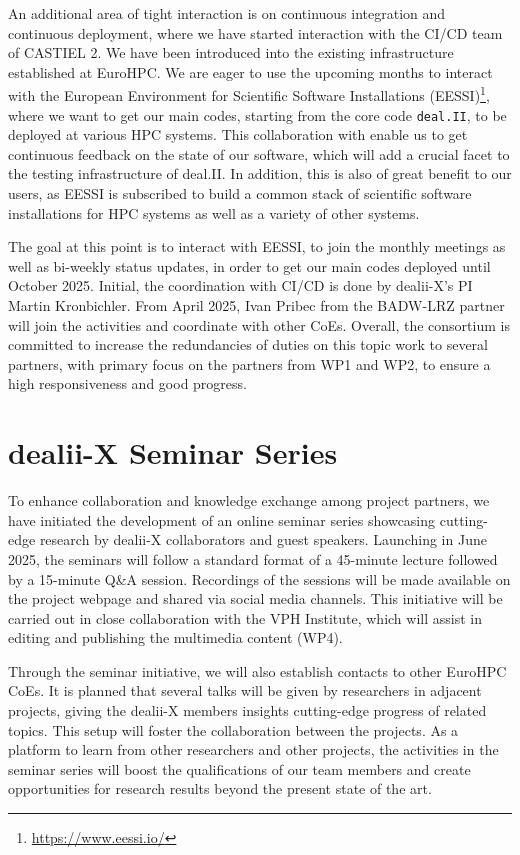 \documentclass[a4paper,12pt]{article}
\begin{document}
An additional area of tight interaction is on continuous integration and
continuous deployment, where we have started interaction with the CI/CD team
of CASTIEL 2. We have been introduced into the existing infrastructure
established at EuroHPC. We are eager to use the upcoming months to interact
with the European Environment for Scientific Software Installations
(EESSI)\footnote{\url{https://www.eessi.io/}}, where we want to get our main
codes, starting from the core code \texttt{deal.II}, to be deployed at various
HPC systems. This collaboration with enable us to get continuous feedback on
the state of our software, which will add a crucial facet to the testing
infrastructure of deal.II. In addition, this is also of great benefit to our
users, as EESSI is subscribed to build a common stack of scientific software
installations for HPC systems as well as a variety of other systems.

The goal at this point is to interact with EESSI, to join the monthly meetings
as well as bi-weekly status updates, in order to get our main codes deployed
until October 2025. Initial, the coordination with CI/CD is done by dealii-X's
PI Martin Kronbichler. From April 2025, Ivan Pribec from the BADW-LRZ partner
will join the activities and coordinate with other CoEs. Overall, the
consortium is committed to increase the redundancies of duties on this topic
work to several partners, with primary focus on the partners from WP1 and WP2,
to ensure a high responsiveness and good progress.

\section{dealii-X Seminar Series}

To enhance collaboration and knowledge exchange among project partners, we have
initiated the development of an online seminar series showcasing cutting-edge
research by dealii-X collaborators and guest speakers. Launching in June 2025,
the seminars will follow a standard format of a 45-minute lecture followed by a
15-minute Q\&A session. Recordings of the sessions will be made available on the
project webpage and shared via social media channels. This initiative will be
carried out in close collaboration with the VPH Institute, which will assist in
editing and publishing the multimedia content (WP4).

Through the seminar initiative, we will also establish contacts to other
EuroHPC CoEs. It is planned that several talks will be given by researchers in
adjacent projects, giving the dealii-X members insights cutting-edge progress
of related topics. This setup will foster the collaboration between the
projects. As a platform to learn from other researchers and other projects,
the activities in the seminar series will boost the qualifications of our team
members and create opportunities for research results beyond the present state
of the art.

\label{MyLastPage}
\end{document}
